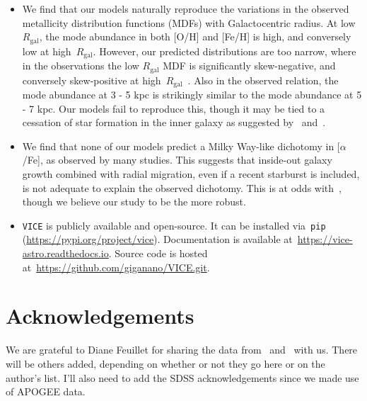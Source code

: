 \documentclass[a4paper, fleqn, usenatbib, useAMS]{mnras}
\begin{document}
\begin{itemize}
	\item We find that our models naturally reproduce the variations in the 
	observed metallicity distribution functions (MDFs) with Galactocentric 
	radius. At low~$R_\text{gal}$, the mode abundance in both [O/H] and [Fe/H] 
	is high, and conversely low at high~$R_\text{gal}$. However, our predicted 
	distributions are too narrow, where in the observations the low 
	$R_\text{gal}$ MDF is significantly skew-negative, and conversely 
	skew-positive at high~$R_\text{gal}$~\citep{Hayden2015}. Also in the 
	observed relation, the mode abundance at 3 - 5 kpc is strikingly similar to 
	the mode abundance at 5 - 7 kpc. Our models fail to reproduce this, though 
	it may be tied to a cessation of star formation in the inner galaxy as 
	suggested by~\citet{Peek2009} and~\citet{Fraternali2012}. 

	\item We find that none of our models predict a Milky Way-like dichotomy 
	in [$\alpha$/Fe], as observed by many studies. This suggests that inside-out 
	galaxy growth combined with radial migration, even if a recent starburst 
	is included, is not adequate to explain the observed dichotomy. This is at 
	odds with~\citet{Sharma2020}, though we believe our study to be the more 
	robust. 

	\item \texttt{VICE} is publicly available and open-source. It can be 
	installed via~\texttt{pip} (\url{https://pypi.org/project/vice}). 
	Documentation is available at~\url{https://vice-astro.readthedocs.io}. 
	Source code is hosted at~\url{https://github.com/giganano/VICE.git}. 
\end{itemize} 

\section{Acknowledgements} 
\label{sec:acknowledgements} 
We are grateful to Diane Feuillet for sharing the data 
from~\citet{Feuillet2018} and~\citet{Feuillet2019} with us. {\color{red} There 
will be others added, depending on whether or not they go here or on the 
author's list. I'll also need to add the SDSS acknowledgements since we made 
use of APOGEE data.} 
\end{document}
